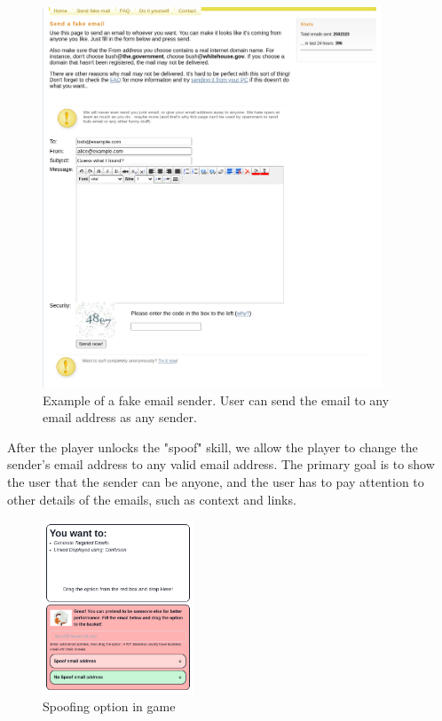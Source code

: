 \begin{figure}[!ht]
    \centering
    \includegraphics[width=0.9\textwidth]{figures/section2/spoof_sender.png}
    \caption[Fake email sender]{Example of a fake email sender. User can send the email to any email address as any sender.}
    \label{fig:spoof_sender}
\end{figure}

After the player unlocks the "spoof" skill, we allow the player to change the sender's email address to any valid email address. The primary goal is to show the user that the sender can be anyone, and the user has to pay attention to other details of the emails, such as context and links.

\begin{figure}[!ht]
    \centering
    \includegraphics[width=0.4\textwidth]{figures/section2/spoofing.png}
    \caption{Spoofing option in game}
    \label{fig:spoofing}
\end{figure}


